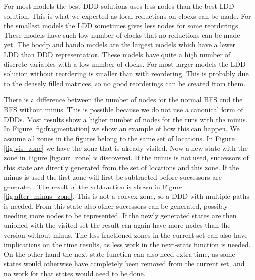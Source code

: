 For most models the best DDD solutions uses less nodes than the best LDD solution. This is what we expected as local reductions on clocks can be made. For the smallest models the LDD sometimes gives less nodes for some reorderings. These models have such low number of clocks that no reductions can be made yet. The bocdp and bando models are the largest models which have a lower LDD than DDD representation. These models have quite a high number of discrete variables with a low number of clocks. For most larger models the LDD solution without reordering is smaller than with reordering. This is probably due to the densely filled matrices, so no good reorderings can be created from them.

There is a difference between the number of nodes for the normal BFS and the BFS without minus. This is possible because we do not use a canonical form of DDDs. Most results show a higher number of nodes for the runs with the minus. In Figure \ref{fig:fragmentation} we show an example of how this can happen. We assume all zones in the figures belong to the same set of locations. In Figure \ref{fig:vis_zone} we have the zone that is already visited. Now a new state with the zone in Figure \ref{fig:cur_zone} is discovered. If the minus is not used, successors of this state are directly generated from the set of locations and this zone. If the minus is used the first zone will first be subtracted before successors are generated. The result of the subtraction is shown in Figure \ref{fig:after_minus_zone}. This is not a convex zone, so a DDD with multiple paths is needed. From this state also other successors can be generated, possibly needing more nodes to be represented. If the newly generated states are then unioned with the visited set the result can again have more nodes than the version without minus. The less fractioned zones in the current set can also have implications on the time results, as less work in the next-state function is needed. On the other hand the next-state function can also need extra time, as some states would otherwise have completely been removed from the current set, and no work for that states would need to be done. 

